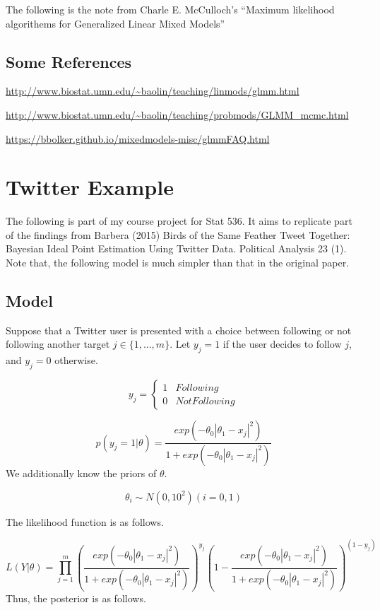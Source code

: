 \documentclass[]{book}
\begin{document}
The following is the note from Charle E. McCulloch's ``Maximum
likelihood algorithems for Generalized Linear Mixed Models''

\section{Some References}\label{some-references}

\url{http://www.biostat.umn.edu/~baolin/teaching/linmods/glmm.html}

\url{http://www.biostat.umn.edu/~baolin/teaching/probmods/GLMM_mcmc.html}

\url{https://bbolker.github.io/mixedmodels-misc/glmmFAQ.html}

\chapter{Twitter Example}\label{twitter-example}

The following is part of my course project for Stat 536. It aims to
replicate part of the findings from Barbera (2015) Birds of the Same
Feather Tweet Together: Bayesian Ideal Point Estimation Using Twitter
Data. Political Analysis 23 (1). Note that, the following model is much
simpler than that in the original paper.

\section{Model}\label{model}

Suppose that a Twitter user is presented with a choice between following
or not following another target \(j \in \{ 1, ..., m\}\). Let
\(y_{j}=1\) if the user decides to follow \(j\), and \(y_{j}=0\)
otherwise.

\[y_{j}=\begin{cases} 1 & Following \\ 0 & Not Following \end{cases}\]

\[p(y_{j}=1|\theta) = \frac{exp(- \theta_0|\theta_1 - x_j|^2)}{1+exp(- \theta_0|\theta_1 - x_j|^2)}\]
We additionally know the priors of \(\theta\).

\[\theta_i \sim N(0,10^2) (i = 0, 1)\]

The likelihood function is as follows.

\[L(Y|\theta)=\prod_{j=1}^{m} (\frac{exp(- \theta_0|\theta_1 - x_j|^2)}{1+exp(- \theta_0|\theta_1 - x_j|^2)})^{y_j}(1-\frac{exp(- \theta_0|\theta_1 - x_j|^2)}{1+exp(- \theta_0|\theta_1 - x_j|^2)})^{(1-y_j)}\]
Thus, the posterior is as follows.
\end{document}
